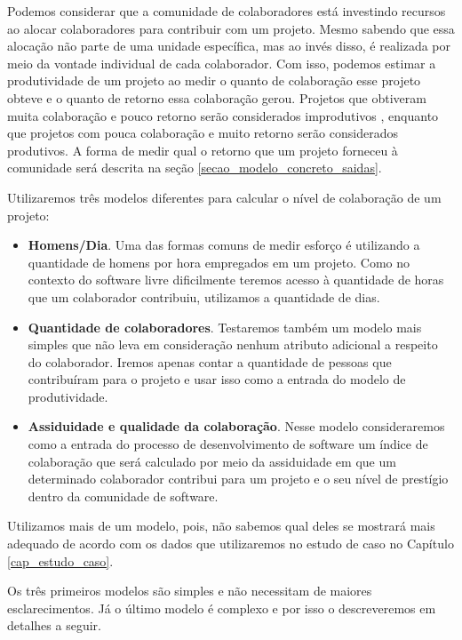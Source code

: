 Podemos considerar que a comunidade de colaboradores está investindo recursos ao alocar colaboradores para contribuir com um projeto. Mesmo sabendo que essa alocação não parte de uma unidade específica, mas ao invés disso, é realizada por meio da vontade individual de cada colaborador. Com isso, podemos estimar a produtividade de um projeto ao medir o quanto de colaboração esse projeto obteve e o quanto de retorno essa colaboração gerou. Projetos que obtiveram muita colaboração e pouco retorno serão considerados improdutivos , enquanto que projetos com pouca colaboração e muito retorno serão considerados produtivos. A forma de medir qual o retorno que um projeto forneceu à comunidade será descrita na seção \ref{secao_modelo_concreto_saidas}.

Utilizaremos três modelos diferentes para calcular o nível de colaboração de um projeto:

\begin{itemize}

\item \textbf{Homens/Dia}. Uma das formas comuns de medir esforço é utilizando a quantidade de homens por hora empregados em um projeto. Como no contexto do software livre dificilmente teremos acesso à quantidade de horas que um colaborador contribuiu, utilizamos a quantidade de dias. 

\item \textbf{Quantidade de colaboradores}. Testaremos também um modelo mais simples que não leva em consideração nenhum atributo adicional a respeito do colaborador. Iremos apenas contar a quantidade de pessoas que contribuíram para o projeto e usar isso como a entrada do modelo de produtividade.
\item \textbf{Assiduidade e qualidade da colaboração}. Nesse modelo consideraremos como a entrada do processo de desenvolvimento de software um índice de colaboração que será calculado por meio da assiduidade em que um determinado colaborador contribui para um projeto e o seu nível de prestígio dentro da comunidade de software. 
\end{itemize}

Utilizamos mais de um modelo, pois, não sabemos qual deles se mostrará mais adequado de acordo com os dados que utilizaremos no estudo de caso no Capítulo \ref{cap_estudo_caso}.

Os três primeiros modelos são simples e não necessitam de maiores esclarecimentos. Já o último modelo é complexo e por isso o descreveremos em detalhes a seguir. 


